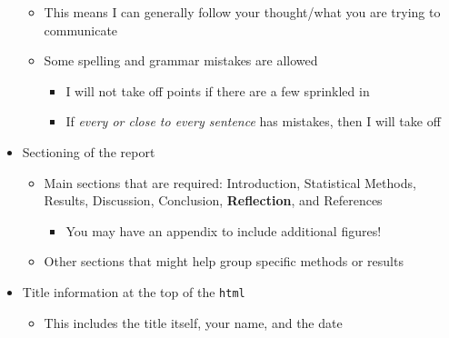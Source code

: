 \documentclass[
  letterpaper,
  DIV=11,
  numbers=noendperiod]{scrartcl}
\providecommand{\tightlist}{%
  \setlength{\itemsep}{0pt}\setlength{\parskip}{0pt}}\usepackage{longtable,booktabs,array}
\begin{document}
\begin{itemize}
  \begin{itemize}
  \tightlist
  \item
    This means I can generally follow your thought/what you are trying
    to communicate
  \item
    Some spelling and grammar mistakes are allowed

    \begin{itemize}
    \tightlist
    \item
      I will not take off points if there are a few sprinkled in
    \item
      If \emph{every or close to every sentence} has mistakes, then I
      will take off
    \end{itemize}
  \end{itemize}
\item
  Sectioning of the report

  \begin{itemize}
  \tightlist
  \item
    Main sections that are required: Introduction, Statistical Methods,
    Results, Discussion, Conclusion, \textbf{Reflection}, and References

    \begin{itemize}
    \tightlist
    \item
      You may have an appendix to include additional figures!
    \end{itemize}
  \item
    Other sections that might help group specific methods or results
  \end{itemize}
\item
  Title information at the top of the \texttt{html}

  \begin{itemize}
  \tightlist
  \item
    This includes the title itself, your name, and the date
  \end{itemize}
\end{itemize}
\end{document}
